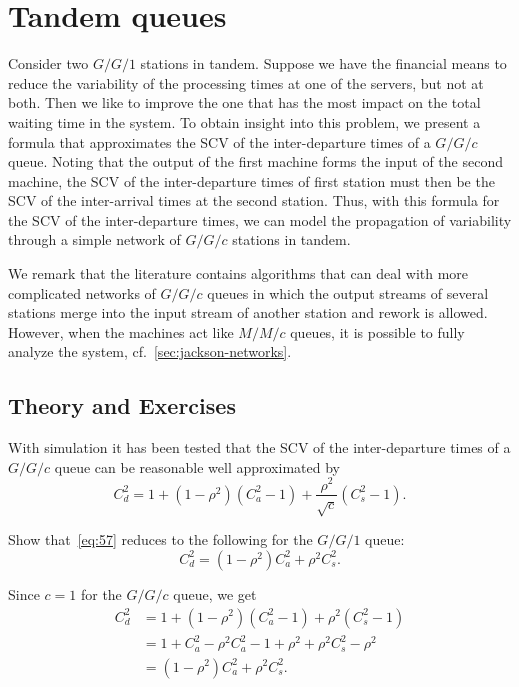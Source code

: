
\section{Tandem queues}
\label{sec:tandem-queues}


Consider two $G/G/1$ stations in tandem.
Suppose we have the financial means to reduce the variability of the processing times at one of the servers, but not at both.
Then we like to improve the one that has the most impact on the total waiting time in the system.
To obtain insight into this problem, we present a formula that approximates the SCV of the inter-departure times of a $G/G/c$ queue.
Noting that the output of the first machine forms the input of the second machine, the SCV of the inter-departure times of first station must then be the SCV of the inter-arrival times at the second station.
Thus, with this formula for the SCV of the inter-departure times, we can model the propagation of variability through a simple network of $G/G/c$ stations in tandem.

We remark that the literature contains algorithms that can deal with more complicated networks of $G/G/c$ queues in which the output streams of several stations merge into the input stream of another station and rework is allowed.
However, when the machines act like $M/M/c$ queues, it is possible to fully analyze the system, cf.~\cref{sec:jackson-networks}.

\subsection*{Theory and Exercises}


With simulation it has been tested that the SCV of the inter-departure times of a $G/G/c$ queue can be reasonable well approximated by
\begin{equation}\label{eq:57}
 C_{d}^2 = 1 + (1-\rho^2)(C_{a}^2-1) + \frac{\rho^2}{\sqrt{c}}(C_{s}^2-1).
\end{equation}


\begin{exercise}
 Show that~\cref{eq:57}  reduces to the following for the $G/G/1$ queue: 
\begin{equation}
 \label{eq:40}
 C_{d}^2 =  (1-\rho^2) C_{a}^2 + \rho^2 C_{s}^2.
\end{equation}
\begin{solution}
 Since $c=1$ for the $G/G/c$ queue, we get
\begin{align*}
 C_{d}^2 
&= 1 + (1-\rho^2)(C_{a}^2-1) + \rho^2(C_{s}^2-1) \\
&= 1 + C_a^2 - \rho^2 C_{a}^2 -1 + \rho^2 + \rho^2 C_{s}^2 -\rho^2 \\
&= (1-\rho^2) C_a^2 + \rho^2 C_{s}^2.
\end{align*}
\end{solution}
\end{exercise}

